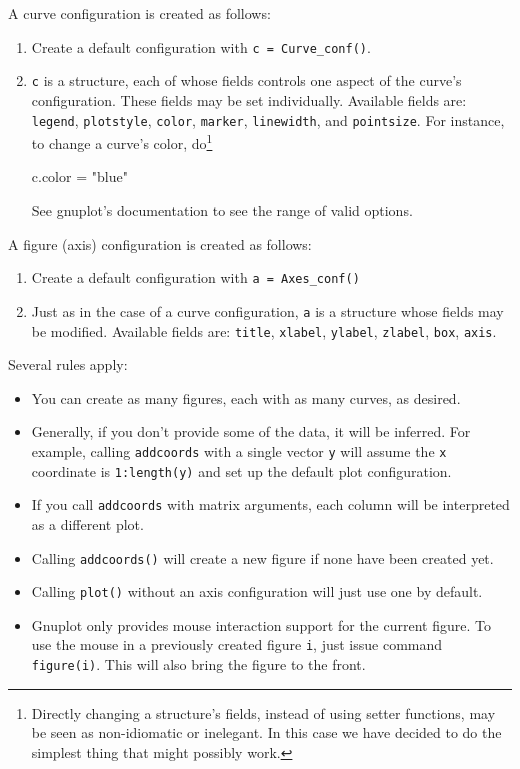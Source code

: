 \documentclass[11pt]{article}
\newcommand{\cmd}[1]{\texttt{#1}}
\begin{document}
A curve configuration is created as follows:
\begin{enumerate}
	\item Create a default configuration with \cmd{c = Curve\_conf()}.
	\item \cmd{c} is a structure, each of whose fields controls one aspect of
		the curve's configuration. These fields may be set individually.
		Available fields are: \cmd{legend}, \cmd{plotstyle}, \cmd{color},
		\cmd{marker}, \cmd{linewidth}, and \cmd{pointsize}. For instance, to
		change a curve's color, do\footnote{Directly changing a structure's
		fields, instead of using setter functions, may be seen as non-idiomatic
		or inelegant. In this case we have decided to do the simplest thing
		that might possibly work.}

\begin{juliacode}
c.color = "blue"
\end{juliacode}

	See gnuplot's documentation to see the range of valid options.

\end{enumerate}

A figure (axis) configuration is created as follows:
\begin{enumerate}
	\item Create a default configuration with \cmd{a = Axes\_conf()}
	\item Just as in the case of a curve configuration, \cmd{a} is a structure
		whose fields may be modified. Available fields are: \cmd{title},
		\cmd{xlabel}, \cmd{ylabel}, \cmd{zlabel}, \cmd{box}, \cmd{axis}.
\end{enumerate}

Several rules apply:
\begin{itemize}
	\item You can create as many figures, each with as many curves, as desired.
	\item Generally, if you don't provide some of the data, it will be
		inferred. For example, calling \cmd{addcoords} with a single vector
		\cmd{y}
		will assume the \cmd{x} coordinate is \cmd{1:length(y)} and set up the
		default plot configuration.
	\item If you call \cmd{addcoords} with matrix arguments, each column will
		be interpreted as a different plot.
	\item Calling \cmd{addcoords()} will create a new figure if none have been
		created yet.
	\item Calling \cmd{plot()} without an axis configuration will just use one
		by default.
	\item Gnuplot only provides mouse interaction support for the current
		figure. To use the mouse in a previously created figure \cmd{i}, just
		issue command \cmd{figure(i)}. This will also bring the figure to the
		front.
\end{itemize}
\end{document}
